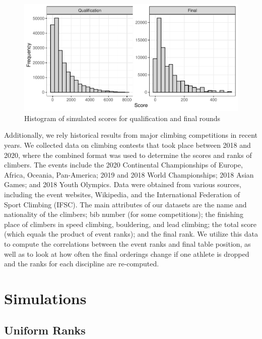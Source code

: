 \documentclass[12pt]{article}
\begin{document}
\begin{figure}
\centering
\includegraphics{draft_files/figure-latex/unnamed-chunk-5-1.pdf}
\caption{Histogram of simulated scores for qualification and final
rounds}
\end{figure}

Additionally, we rely historical results from major climbing
competitions in recent years. We collected data on climbing contests
that took place between 2018 and 2020, where the combined format was
used to determine the scores and ranks of climbers. The events include
the 2020 Continental Championships of Europe, Africa, Oceania,
Pan-America; 2019 and 2018 World Championships; 2018 Asian Games; and
2018 Youth Olympics. Data were obtained from various sources, including
the event websites, Wikipedia, and the International Federation of Sport
Climbing (IFSC). The main attributes of our datasets are the name and
nationality of the climbers; bib number (for some competitions); the
finishing place of climbers in speed climbing, bouldering, and lead
climbing; the total score (which equals the product of event ranks); and
the final rank. We utilize this data to compute the correlations between
the event ranks and final table position, as well as to look at how
often the final orderings change if one athlete is dropped and the ranks
for each discipline are re-computed.

\hypertarget{simulations}{%
\section{Simulations}\label{simulations}}

\hypertarget{uniform-ranks}{%
\subsection{Uniform Ranks}\label{uniform-ranks}}
\end{document}
